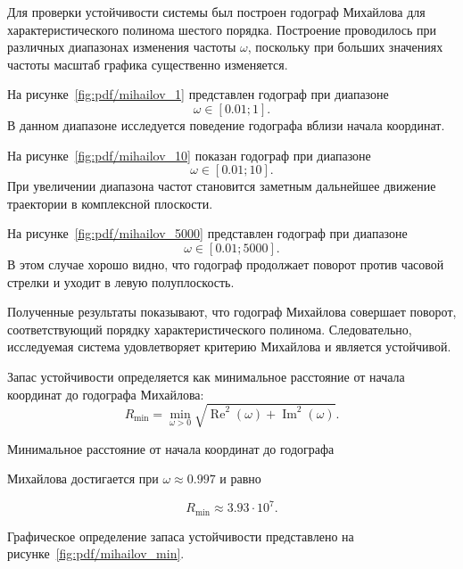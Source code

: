 Для проверки устойчивости системы был построен годограф Михайлова для характеристического полинома шестого порядка. Построение проводилось при различных диапазонах изменения частоты $\omega$, поскольку при больших значениях частоты масштаб графика существенно изменяется.

На рисунке~\ref{fig:pdf/mihailov_1} представлен годограф при диапазоне
\[
\omega \in [0.01;1].
\]
В данном диапазоне исследуется поведение годографа вблизи начала координат.


На рисунке~\ref{fig:pdf/mihailov_10} показан годограф при диапазоне
\[
\omega \in [0.01;10].
\]
При увеличении диапазона частот становится заметным дальнейшее движение траектории в комплексной плоскости.


На рисунке~\ref{fig:pdf/mihailov_5000} представлен годограф при диапазоне
\[
\omega \in [0.01;5000].
\]
В этом случае хорошо видно, что годограф продолжает поворот против часовой стрелки и уходит в левую полуплоскость.


Полученные результаты показывают, что годограф Михайлова совершает поворот, соответствующий порядку характеристического полинома. Следовательно, исследуемая система удовлетворяет критерию Михайлова и является устойчивой.

Запас устойчивости определяется как минимальное расстояние от начала координат до годографа Михайлова:
\begin{equation}
    R_{\min}
    =
    \min_{\omega > 0}
    \sqrt{
        \operatorname{Re}^2(\omega)
        +
        \operatorname{Im}^2(\omega)
    }.
\end{equation}

Минимальное расстояние от начала координат до годографа

Михайлова достигается при $\omega \approx 0.997$ и равно

\begin{equation}
    R_{\min} \approx 3.93 \cdot 10^7.
\end{equation}

Графическое определение запаса устойчивости представлено на рисунке~\ref{fig:pdf/mihailov_min}.

